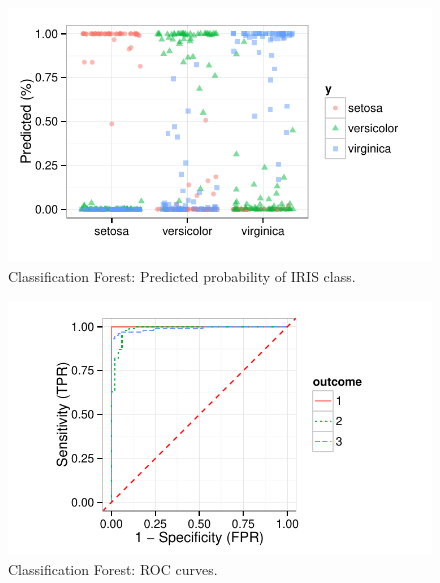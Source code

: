 \documentclass[nojss]{jss}\usepackage[]{graphicx}\usepackage[]{color}
\makeatletter
\def\maxwidth{ %
  \ifdim\Gin@nat@width>\linewidth
    \linewidth
  \else
    \Gin@nat@width
  \fi
}
\newenvironment{knitrout}{}{} %
\makeatother
\begin{document}
\begin{knitrout}\footnotesize
{}\color{fgcolor}\begin{figure}[!htpb]

{\centering \includegraphics[width=\maxwidth]{figure/vig-iris-rf-pred-1} 

}

\caption[Classification Forest]{Classification Forest: Predicted probability of IRIS class.\label{fig:iris-rf-pred}}
\end{figure}


\end{knitrout}


\begin{knitrout}\footnotesize
{}\color{fgcolor}\begin{figure}[!htpb]

{\centering \includegraphics[width=\maxwidth]{figure/vig-iris-rf-roc-1} 

}

\caption[Classification Forest]{Classification Forest: ROC curves.\label{fig:iris-rf-roc}}
\end{figure}


\end{knitrout}
\end{document}

